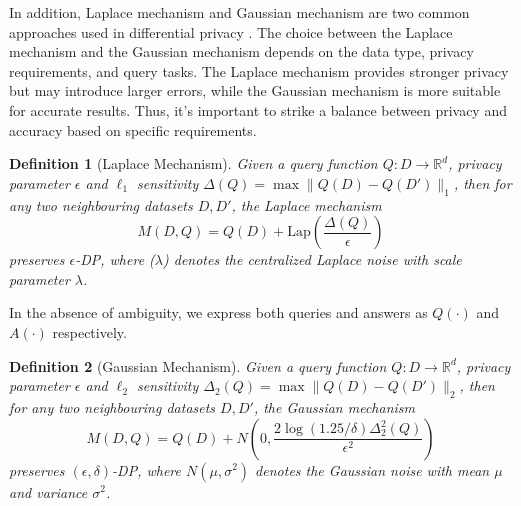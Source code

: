 \documentclass[letterpaper]{article} %
\newtheorem{definition}{Definition}
\begin{document}
In addition, Laplace mechanism and Gaussian mechanism  are two common approaches used in differential privacy \cite{Dwork2014algorithmic}. The choice between the Laplace mechanism and the Gaussian mechanism depends on the data type, privacy requirements, and query tasks. The Laplace mechanism provides stronger privacy but may introduce larger errors, while the Gaussian mechanism is more suitable for accurate results. Thus, it's important to strike a balance between privacy and accuracy based on specific requirements.
\begin{definition}[Laplace Mechanism]
Given a query function $Q: D \rightarrow \mathbb{R}^d$, privacy parameter $\epsilon$ and $\ell_1$ sensitivity $\Delta (Q) = \max \| Q(D) - Q(D')\|_1$, then for any two neighbouring datasets $D,D'$,
the Laplace mechanism
\begin{equation}
M(D, Q) = Q(D) + \text{Lap}\left(\frac{\Delta (Q)}{\epsilon}\right)
\end{equation}
preserves $\epsilon$-DP, where ($\lambda$) denotes the centralized Laplace noise with scale parameter $\lambda$.
\end{definition}
In the absence of ambiguity, we express both queries and answers as $Q(\cdot)$ and $A(\cdot)$ respectively.
\begin{definition}[Gaussian Mechanism]
 Given a query function $Q: D \rightarrow \mathbb{R}^d$, privacy parameter $\epsilon$ and $\ell_2$ sensitivity $\Delta_2 (Q) = \max \|Q(D)-Q(D')\|_2$, then for any two neighbouring datasets $D,D'$, the Gaussian mechanism
\begin{equation}
M(D, Q) = Q(D) + N\left(0, \frac{2\log(1.25/\delta)\Delta_2^2(Q)}{\epsilon^2}\right)
\end{equation}
preserves $(\epsilon,\delta)$-DP,
where $N(\mu, \sigma^2)$ denotes the Gaussian noise with mean $\mu$ and variance $\sigma^2$.
\end{definition}
\end{document}
